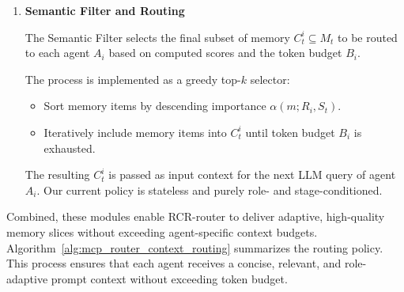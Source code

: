 \documentclass[letterpaper]{article} %
\begin{document}
\begin{enumerate}
    \item \textbf{Semantic Filter and Routing %
    }

    The Semantic Filter selects the final subset of memory $C_t^i \subseteq M_t$ to be routed to each agent $A_i$ based on computed scores and the token budget $B_i$.

    The process is implemented as a greedy top-$k$ selector:
    \begin{itemize}
        \item Sort memory items by descending importance $\alpha(m; R_i, S_t)$.
        \item Iteratively include memory items into $C_t^i$ until token budget $B_i$ is exhausted.
    \end{itemize}

    The resulting $C_t^i$ is passed as input context for the next LLM query of agent $A_i$. Our current policy is stateless and purely role- and stage-conditioned. %
   
\end{enumerate}
 Combined, these modules enable RCR-router to deliver adaptive, high-quality memory slices without exceeding agent-specific context budgets.
Algorithm~\ref{alg:mcp_router_context_routing} summarizes the routing policy.
This process ensures that each agent receives a concise, relevant, and role-adaptive prompt context without exceeding  token budget.


\end{document}
